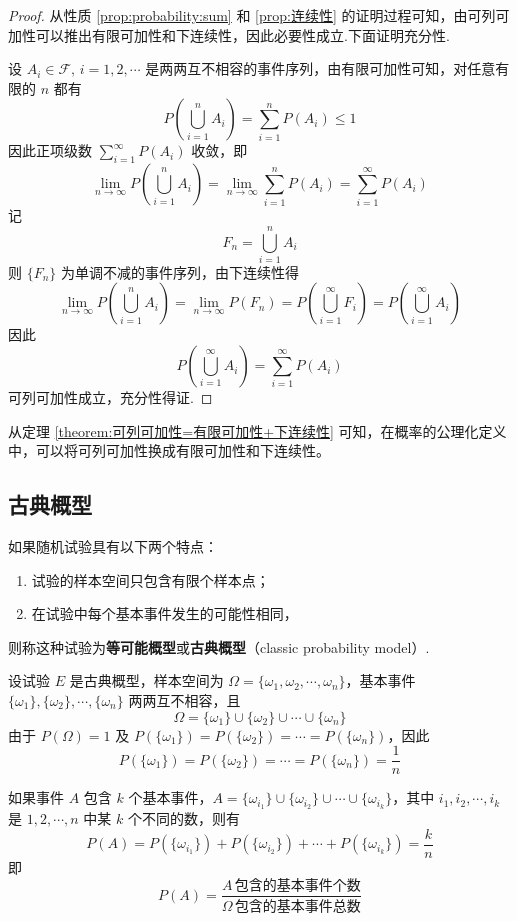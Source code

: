 \begin{proof}
    从性质 \ref{prop:probability:sum} 和 \ref{prop:连续性} 的证明过程可知，由可列可加性可以推出有限可加性和下连续性，因此必要性成立.下面证明充分性.

    设 $A_i \in \mathcal{F}, \, i=1,2,\cdots$ 是两两互不相容的事件序列，由有限可加性可知，对任意有限的 $n$ 都有
    $$
    P \left( \bigcup_{i=1}^n A_i \right) = \sum_{i=1}^n P(A_i) \leqslant 1
    $$
    因此正项级数 $\displaystyle\sum_{i=1}^{\infty} P(A_i)$ 收敛，即
    $$
    \lim_{n \to \infty} P \left( \bigcup_{i=1}^n A_i \right) = \lim_{n \to \infty} \sum_{i=1}^n P(A_i) = \sum_{i=1}^{\infty} P(A_i)
    $$
    记
    $$
    F_n = \bigcup_{i=1}^n A_i
    $$
    则 $\{ F_n \}$ 为单调不减的事件序列，由下连续性得
    $$
    \lim_{n \to \infty} P \left( \bigcup_{i=1}^n A_i \right) = \lim_{n \to \infty} P(F_n) = P \left(  \bigcup_{i=1}^{\infty} F_i \right) = P \left( \bigcup_{i=1}^{\infty} A_i \right)
    $$
    因此
    $$
    P \left( \bigcup_{i=1}^{\infty} A_i \right) = \sum_{i=1}^{\infty} P(A_i)
    $$
    可列可加性成立，充分性得证.
\end{proof}

\begin{note}
    从定理 \ref{theorem:可列可加性=有限可加性+下连续性} 可知，在概率的公理化定义中，可以将可列可加性换成有限可加性和下连续性。
\end{note}

\subsection{古典概型}

如果随机试验具有以下两个特点：
\begin{enumerate}
    \item 试验的样本空间只包含有限个样本点；
    \item 在试验中每个基本事件发生的可能性相同，
\end{enumerate}
则称这种试验为\textbf{等可能概型}或\textbf{古典概型}（classic probability model）.

设试验 $E$ 是古典概型，样本空间为 $\varOmega = \{\omega_1,\omega_2,\cdots,\omega_n\}$，基本事件 $\{\omega_1\},\{\omega_2\},\cdots,\{\omega_n\}$ 两两互不相容，且
$$
\varOmega = \{\omega_1\} \cup \{\omega_2\} \cup \cdots \cup \{\omega_n\}
$$
由于 $P(\varOmega)=1$ 及 $P(\{\omega_1\})=P(\{\omega_2\})=\cdots=P(\{\omega_n\})$，因此
$$
P(\{\omega_1\})=P(\{\omega_2\})=\cdots=P(\{\omega_n\})=\dfrac{1}{n}
$$

如果事件 $A$ 包含 $k$ 个基本事件，$A=\{\omega_{i_1}\} \cup \{\omega_{i_2}\} \cup \cdots \cup \{\omega_{i_k}\}$，其中 $i_1,i_2,\cdots,i_k$ 是 $1,2,\cdots,n$ 中某 $k$ 个不同的数，则有
$$
P(A) = P(\{\omega_{i_1}\}) + P(\{\omega_{i_2}\}) + \cdots + P(\{\omega_{i_k}\}) = \dfrac{k}{n}
$$
即
$$
P(A)=\dfrac{A\,\text{包含的基本事件个数}}{\varOmega\,\text{包含的基本事件总数}}
$$

